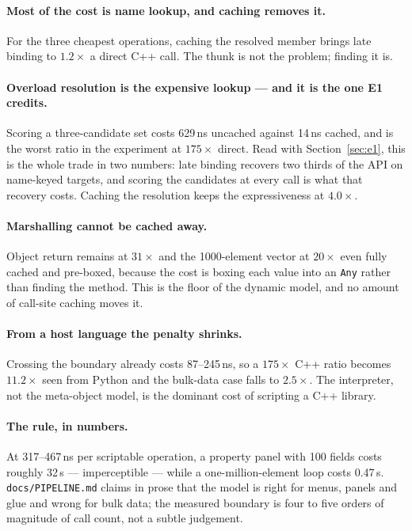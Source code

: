 \documentclass[11pt,a4paper]{article}
\newcommand{\code}[1]{\texttt{\small #1}}
\begin{document}
\paragraph{Most of the cost is name lookup, and caching removes it.} For the
three cheapest operations, caching the resolved member brings late binding to
$1.2\times$ a direct C++ call. The thunk is not the problem; finding it is.

\paragraph{Overload resolution is the expensive lookup --- and it is the one
E1 credits.} Scoring a three-candidate set costs 629\,ns uncached against
14\,ns cached, and is the worst ratio in the experiment at $175\times$ direct.
Read with Section~\ref{sec:e1}, this is the whole trade in two numbers: late
binding recovers two thirds of the API on name-keyed targets, and scoring the
candidates at every call is what that recovery costs. Caching the resolution
keeps the expressiveness at $4.0\times$.

\paragraph{Marshalling cannot be cached away.} Object return remains at
$31\times$ and the 1000-element vector at $20\times$ even fully cached and
pre-boxed, because the cost is boxing each value into an \code{Any} rather than
finding the method. This is the floor of the dynamic model, and no amount of
call-site caching moves it.

\paragraph{From a host language the penalty shrinks.} Crossing the boundary
already costs 87--245\,ns, so a $175\times$ C++ ratio becomes $11.2\times$ seen
from Python and the bulk-data case falls to $2.5\times$. The interpreter, not
the meta-object model, is the dominant cost of scripting a C++ library.

\paragraph{The rule, in numbers.} At 317--467\,ns per scriptable operation, a
property panel with 100 fields costs roughly 32\,\textmu s --- imperceptible ---
while a one-million-element loop costs 0.47\,s. \code{docs/PIPELINE.md} claims
in prose that the model is right for menus, panels and glue and wrong for bulk
data; the measured boundary is four to five orders of magnitude of call count,
not a subtle judgement.
\end{document}
